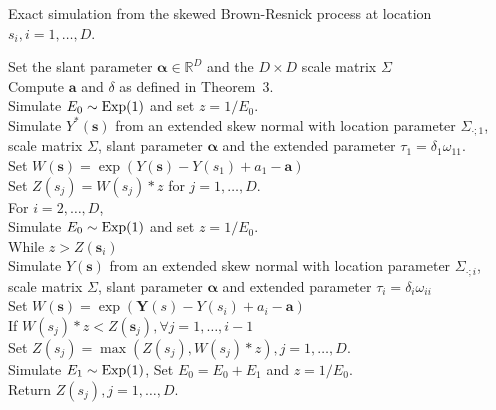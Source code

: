 \documentclass[lineno]{biometrika}
\begin{document}
\begin{algo}
Exact simulation from the skewed Brown-Resnick process at location $s_i,i=1,\dots,D$.
\label{algo:log_skew_normal}
\begin{tabbing}
    \qquad \enspace Set the slant parameter $\bm \alpha \in \mathbb{R}^D$ and the $D \times D$ scale matrix $\Sigma$ \\
    \qquad \enspace Compute $\bm a$ and $\delta$ as defined in Theorem~3.\\
    \qquad \enspace Simulate $E_0 \sim \rm{Exp}(1)$ and set $z=1/E_0$.\\    
    \qquad \enspace Simulate $Y^*(\bm s)$ from an extended skew normal with location parameter $\Sigma_{\cdot;1}$,\\
    \qquad \enspace scale matrix $\Sigma$, slant parameter $\bm \alpha$ and the extended parameter $\tau_1=\delta_1 \omega_{11}$.\\
    \qquad \enspace Set $W(\bm s) = \exp(Y(\bm s)-Y(s_1)+a_1 - \bm a)$ \\
    \qquad \enspace Set $Z(s_j)=W(s_j)*z$ for $j=1,\dots,D$. \\
    \qquad \enspace For {$i=2,\dots,D$}, \\
    \qquad \qquad \enspace Simulate $E_0 \sim \rm{Exp}(1)$ and set $z=1/E_0$. \\
    \qquad \qquad \enspace While {$z > Z(\bm s_i)$} \\
    \qquad \qquad \qquad \enspace Simulate $Y(\bm s)$ from an extended skew normal with location parameter $\Sigma_{\cdot;i}$, \\
    \qquad \qquad \qquad \enspace scale matrix $\Sigma$, slant parameter $\bm \alpha$ and extended parameter $\tau_i=\delta_i\omega_{ii}$ \\
    \qquad \qquad \qquad \enspace Set $W(\bm s) = \exp(\bm Y(s)-Y(s_i)+a_i - \bm a)$ \\
    \qquad \qquad \qquad \enspace  If {$W(s_{j})*z < Z(\bm s_j), \forall j=1,\dots,i-1$} \\
    \qquad \qquad \qquad \qquad \enspace Set $Z(s_j)=\max(Z(s_j),W(s_j)*z),j=1,\dots,D$. \\
    \qquad \qquad \qquad \enspace Simulate $E_1 \sim \rm{Exp}(1)$, Set $E_0 = E_0 + E_1$ and $z=1/E_0$. \\
    \qquad \enspace Return $Z(s_j),j=1,\dots,D$.
\end{tabbing}
\end{algo}



\end{document}
